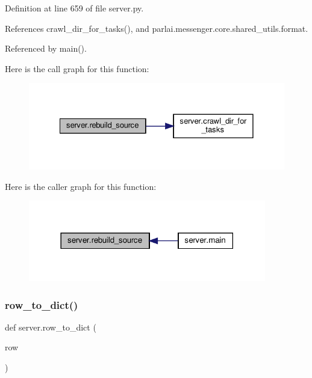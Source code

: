 Definition at line 659 of file server.\+py.



References crawl\+\_\+dir\+\_\+for\+\_\+tasks(), and parlai.\+messenger.\+core.\+shared\+\_\+utils.\+format.



Referenced by main().

Here is the call graph for this function\+:
\nopagebreak
\begin{figure}[H]
\begin{center}
\leavevmode
\includegraphics[width=328pt]{namespaceserver_a802e832a8f540e02174b559972488adb_cgraph}
\end{center}
\end{figure}
Here is the caller graph for this function\+:
\nopagebreak
\begin{figure}[H]
\begin{center}
\leavevmode
\includegraphics[width=294pt]{namespaceserver_a802e832a8f540e02174b559972488adb_icgraph}
\end{center}
\end{figure}
\mbox{\label{namespaceserver_a417f4d334a42b589c973649990ea52a8}} 
\subsubsection{\texorpdfstring{row\+\_\+to\+\_\+dict()}{row\_to\_dict()}}
{\footnotesize\ttfamily def server.\+row\+\_\+to\+\_\+dict (\begin{DoxyParamCaption}\item[{}]{row }\end{DoxyParamCaption})}



